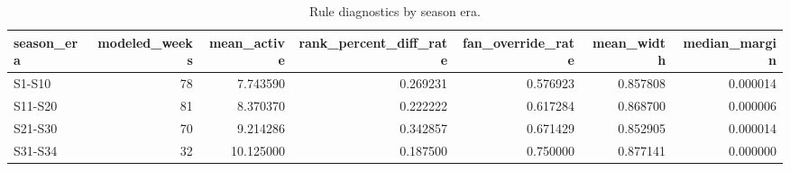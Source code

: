 \begin{table}
\caption{Rule diagnostics by season era.}
\begin{tabular}{lrrrrrr}
\toprule
season\_era & modeled\_weeks & mean\_active & rank\_percent\_diff\_rate & fan\_override\_rate & mean\_width & median\_margin \\
\midrule
S1-S10 & 78 & 7.743590 & 0.269231 & 0.576923 & 0.857808 & 0.000014 \\
S11-S20 & 81 & 8.370370 & 0.222222 & 0.617284 & 0.868700 & 0.000006 \\
S21-S30 & 70 & 9.214286 & 0.342857 & 0.671429 & 0.852905 & 0.000014 \\
S31-S34 & 32 & 10.125000 & 0.187500 & 0.750000 & 0.877141 & 0.000000 \\
\bottomrule
\end{tabular}
\end{table}
